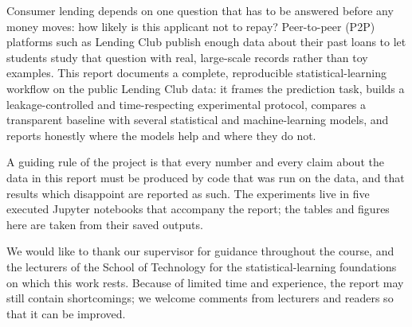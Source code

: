 Consumer lending depends on one question that has to be answered before any money moves: how likely is this applicant not to repay? Peer-to-peer (P2P) platforms such as Lending Club publish enough data about their past loans to let students study that question with real, large-scale records rather than toy examples. This report documents a complete, reproducible statistical-learning workflow on the public Lending Club data: it frames the prediction task, builds a leakage-controlled and time-respecting experimental protocol, compares a transparent baseline with several statistical and machine-learning models, and reports honestly where the models help and where they do not.

A guiding rule of the project is that every number and every claim about the data in this report must be produced by code that was run on the data, and that results which disappoint are reported as such. The experiments live in five executed Jupyter notebooks that accompany the report; the tables and figures here are taken from their saved outputs.

We would like to thank our supervisor  for guidance throughout the course, and the lecturers of the School of Technology for the statistical-learning foundations on which this work rests. Because of limited time and experience, the report may still contain shortcomings; we welcome comments from lecturers and readers so that it can be improved.
